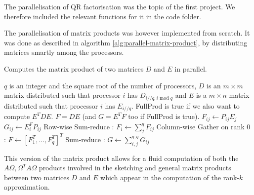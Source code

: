 \documentclass[a4paper, 12pt,oneside]{article}
\begin{document}
	The parallelisation of QR factorisation was the topic of the first project. We therefore included the relevant functions for it in the code folder. 
	
	The parallelisation of matrix products was however implemented from scratch. It was done as described in algorithm \ref{alg:parallel-matrix-product}, by distributing matrices smartly among the processors. 
	\begin{algorithm}[H]
		\caption{Computes the matrix product of two matrices $D$ and $E$ in parallel.}\label{alg:parallel-matrix-product}
		\begin{algorithmic}
		\Require $q$ is an integer and the square root of the number of processors, $D$ is an $m\times m$ matrix distributed such that processor $i$ has $D_{i//q,i\text{ mod }q}$ and $E$ is a $m\times n$ matrix distributed such that processor $i$ has $E_{i//q}$. FullProd is true if we also want to compute $E^TDE$.
		\Ensure $F=DE$ (and $G=E^TF$ too if FullProd is true). 
		\State $F_{ij} \gets P_{ij}E_j$
			\State $G_{ij} \gets E_i^FP_{ij}$
		\EndIf		
		\State Row-wise Sum-reduce : $F_i\gets \sum_j^q F_{ij}$
		\State Column-wise Gather on rank 0 : $F\gets [F_1^T,...,F_q^T]^T$
			\State Sum-reduce : $G\gets \sum_{i,j}^{q,q} G_{ij}$
		\EndIf
		\end{algorithmic}
	\end{algorithm}
	This version of the matrix product allows for a fluid computation of both the $A \Omega,\Omega^T A \Omega$ products involved in the sketching and general matrix products between two matrices $D$ and $E$ which appear in the computation of the rank-$k$ approximation. 
	
\end{document}
